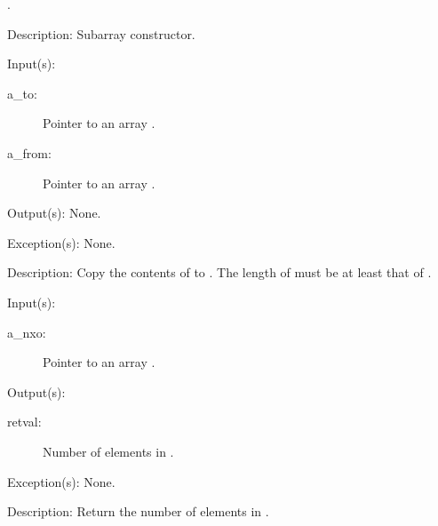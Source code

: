 \begin{capi}
\begin{capilist}
\begin{description}
		\item[.]
		\end{description}
	\item[Description: ]
		Subarray constructor.
	\end{capilist}
\label{nxo_array_copy}
	\begin{capilist}
	\item[Input(s): ]
		\begin{description}\item[]
		\item[a\_to: ]
			Pointer to an array .
		\item[a\_from: ]
			Pointer to an array .
		\end{description}
	\item[Output(s): ] None.
	\item[Exception(s): ] None.
	\item[Description: ]
		Copy the contents of  to .  The length
		of  must be at least that of .
	\end{capilist}
\label{nxo_array_len_get}
	\begin{capilist}
	\item[Input(s): ]
		\begin{description}\item[]
		\item[a\_nxo: ]
			Pointer to an array \classname{nxo}.
		\end{description}
	\item[Output(s): ]
		\begin{description}\item[]
		\item[retval: ]
			Number of elements in \cvar{a\_nxo}.
		\end{description}
	\item[Exception(s): ] None.
	\item[Description: ]
		Return the number of elements in \cvar{a\_nxo}.
	\end{capilist}
\label{nxo_array_el_get}
	\begin{capilist}

\end{capilist}
\end{capi}
